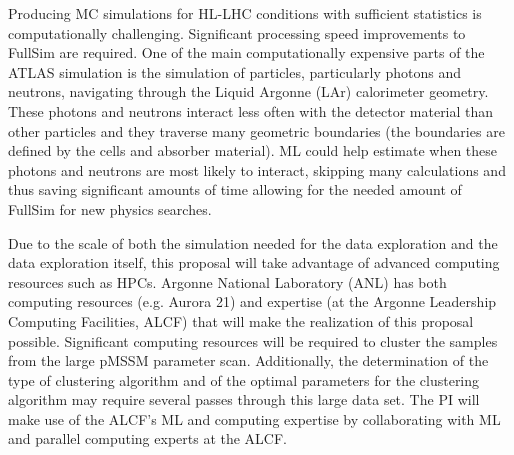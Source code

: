 \documentclass[letter, USenglish, 11pt]{article}
\begin{document}



Producing MC simulations for HL-LHC conditions with sufficient statistics is computationally challenging. Significant processing speed improvements to FullSim are required. One of the main computationally expensive parts of the ATLAS simulation is the simulation of particles, particularly photons and neutrons, navigating through the Liquid Argonne (LAr) calorimeter geometry. These photons and neutrons interact less often with the detector material than other particles and they traverse many geometric boundaries (the boundaries are defined by the cells and absorber material). ML could help estimate when these photons and neutrons are most likely to interact, skipping many calculations and thus saving significant amounts of time allowing for the needed amount of FullSim for new physics searches.

Due to the scale of both the simulation needed for the data exploration and the data exploration itself, this proposal will take advantage of advanced computing resources such as HPCs. Argonne National Laboratory (ANL) has both computing resources (e.g. Aurora 21) and expertise (at the Argonne Leadership Computing Facilities, ALCF) that will make the realization of this proposal possible. Significant computing resources will be required to cluster the samples from the large pMSSM parameter scan. Additionally, the determination of the type of clustering algorithm and of the optimal parameters for the clustering algorithm may require several passes through this large data set. The PI will make use of the ALCF's ML and computing expertise by collaborating with ML and parallel computing experts at the ALCF. 
\end{document}
